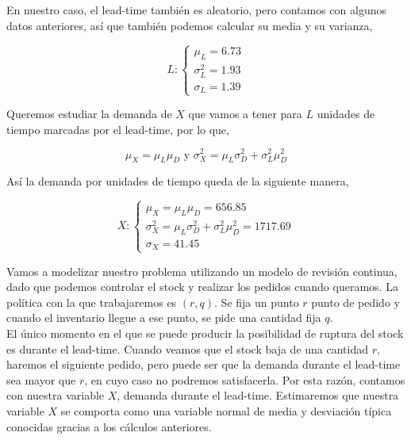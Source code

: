\documentclass[a4paper,12pt]{article}
\begin{document}
En nuestro caso, el lead-time tambi\'en es aleatorio, pero contamos con algunos datos anteriores, as\'i que tambi\'en podemos calcular su media y su varianza,


	\begin{equation*}
	L:  \left\lbrace \begin{array}{l}
		\mu_L = 6.73\\
		\sigma_L^2 = 1.93\\
		\sigma_L = 1.39
	\end{array}
	\right. 
	\end{equation*}

Queremos estudiar la demanda de $X$ que vamos a tener para $L$ unidades de tiempo marcadas por el lead-time, por lo que,

$$\mu_X = \mu_L \mu_D \text{ y } \sigma_X^2 = \mu_L \sigma_D^2 + \sigma_L^2 \mu_D^2$$

As\'i la demanda por unidades de tiempo queda de la siguiente manera,


	\begin{equation*}
	X:  \left\lbrace \begin{array}{l}
		\mu_X = \mu_L \mu_D = 656.85\\
		\sigma_X^2 = \mu_L \sigma_D^2 + \sigma_L^2 \mu_D^2 = 1717.69\\
		\sigma_X = 41.45
	\end{array}
	\right. 
	\end{equation*}

Vamos a modelizar nuestro problema utilizando un modelo de revisi\'on continua, dado que podemos controlar el stock y realizar los pedidos cuando queramos. La pol\'itica con la que trabajaremos es $(r, q)$. Se fija un punto $r$ punto de pedido y cuando el inventario llegue a ese punto, se pide una cantidad fija $q$. \\

El \'unico momento en el que se puede producir la posibilidad de ruptura del stock es durante el lead-time. Cuando veamos que el stock baja de una cantidad $r$, haremos el siguiente pedido, pero puede ser que la demanda durante el lead-time sea mayor que $r$, en cuyo caso no podremos satisfacerla. Por esta raz\'on, contamos con nuestra variable $X$, demanda durante el lead-time. Estimaremos que nuestra variable $X$ se comporta como una variable normal de media y desviaci\'on t\'ipica conocidas gracias a los c\'alculos anteriores.\\
\end{document}

